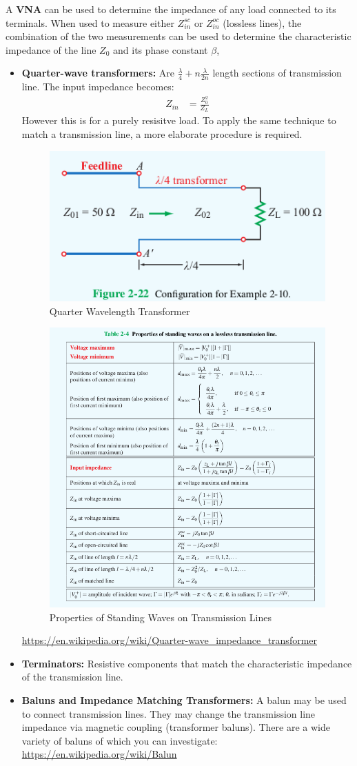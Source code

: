 \documentclass{book}
\begin{document}
A \textbf{VNA} can be used to determine the impedance of any load connected to its terminals. When used to measure either $Z_{in}^{sc}$ or $Z_{in}^{oc}$ (lossless lines), the combination of the two measurements can be used to determine the characteristic impedance of the line $Z_0$ and its phase constant $\beta$,
\begin{itemize}
	\item \textbf{Quarter-wave transformers:} Are $\frac{\lambda}{4}+n \frac{\lambda}{2n}$ length sections of transmission line. The input impedance becomes:
	\begin{align*}
		Z_{in} &= \frac{Z_0 ^2}{Z_L}
	\end{align*}
	However this is for a purely resisitve load. To apply the same technique to match a transmission line, a more elaborate procedure is required.
	\begin{figure}
		\centering
		\includegraphics[width=0.4\linewidth]{Screenshots/quarter_wl_transf}
		\caption{Quarter Wavelength Transformer}
		\label{fig:quarterwltransf}
	\end{figure}
	
	\begin{figure}[h]
		\centering
		\includegraphics[width=0.5\linewidth]{Screenshots/standing_wave_transmission}
		\caption{Properties of Standing Waves on Transmission Lines}
		\label{fig:standingwavetransmission}
	\end{figure}
	
	 \url{https://en.wikipedia.org/wiki/Quarter-wave_impedance_transformer}
	\item \textbf{Terminators:} Resistive components that match the characteristic impedance of the transmission line.
	\item \textbf{Baluns and Impedance Matching Transformers:} A balun may be used to connect transmission lines. They may change the transmission line impedance via magnetic coupling (transformer baluns). There are a wide variety of baluns of which you can investigate: \url{https://en.wikipedia.org/wiki/Balun}
\end{itemize}
\end{document}
